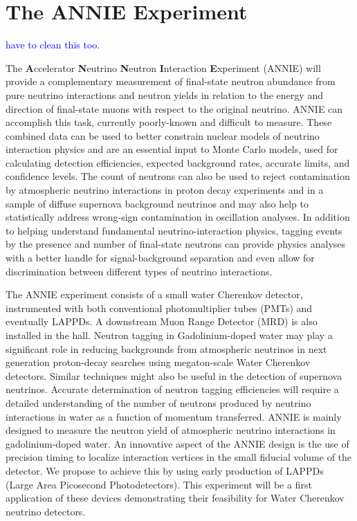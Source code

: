 
\chapter{The ANNIE Experiment}
\label{cha:2}
\textcolor{blue}{have to clean this too.}

The \textbf{A}ccelerator \textbf{N}eutrino \textbf{N}eutron \textbf{I}nteraction %
\textbf{E}xperiment (ANNIE) will provide a complementary measurement of final-state %
neutron abundance from pure neutrino interactions and neutron yields in relation to %
the energy and direction of final-state muons with respect to the original neutrino.
ANNIE can accomplish this task, currently poorly-known and difficult to measure.
These combined data can be used to better constrain nuclear models of neutrino interaction %
physics and are an essential input to Monte Carlo models, used for calculating %
detection efficiencies, expected background rates, accurate limits, and confidence levels.
The count of neutrons can also be used to reject contamination by atmospheric %
neutrino interactions in proton decay experiments and in a sample of diffuse supernova %
background neutrinos and may also help to statistically address wrong-sign contamination %
in oscillation analyses.
In addition to helping understand fundamental neutrino-interaction physics, tagging events %
by the presence and number of final-state neutrons can provide physics analyses with a better %
handle for signal-background separation and even allow for discrimination between %
different types of neutrino interactions.

The ANNIE experiment consists of a small water Cherenkov detector, instrumented
with both conventional photomultiplier tubes (PMTs) and eventually LAPPDs.
A downstream Muon Range Detector (MRD) is also installed in the hall.
Neutron tagging in Gadolinium-doped water may play a significant role
in reducing backgrounds from atmospheric neutrinos in next generation 
proton-decay searches using megaton-scale Water Cherenkov detectors.
Similar techniques might also be useful in the detection of supernova neutrinos. 
Accurate determination of neutron tagging efficiencies will require a 
detailed understanding of the number of neutrons produced by neutrino interactions 
in water as a function of momentum transferred.
ANNIE is mainly designed to measure the neutron yield of atmospheric neutrino interactions 
in gadolinium-doped water.
An innovative aspect of the ANNIE design is the use of precision timing to 
localize interaction vertices in the small fiducial volume of the detector.
We propose to achieve this by using early production of LAPPDs 
(Large Area Picosecond Photodetectors).
This experiment will be a first application of these devices demonstrating
their feasibility for Water Cherenkov neutrino detectors.

